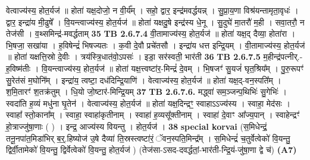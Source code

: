 \documentclass[17pt]{extarticle}
\begin{document}
                  वेत्वाज्य॑स्य॒ होत॒र्यज॑ ॥ होता॑ यक्ष॒दोजो॒ न वी॒र्य᳚म् । सहो॒ द्वार॒ इन्द्र॑मवर्द्धयन्न् । सु॒प्रा॒य॒णा विश्र॑यन्तामृता॒वृधः॑ । द्वार॒ इन्द्रा॑य मी॒ढुषे᳚ । वि॒यन्त्वाज्य॑स्य॒ होत॒र्यज॑ ॥ होता॑ यक्षदु॒षे इन्द्र॑स्य धे॒नू । सु॒दुघे॑ मा॒तरौ॑ म॒ही । सवा॒तरौ॒ न तेज॑सी । व॒थ्समिन्द्र॑-मवर्द्धताम् \textbf{ 35} \newline
                  \newline
                                \textbf{ TB 2.6.7.4} \newline
                  वी॒तामाज्य॑स्य॒ होत॒र्यज॑ ॥ होता॑ यक्ष॒द् दैव्या॒ होता॑रा । भि॒षजा॒ सखा॑या । ह॒विषेन्द्रं॑ भिषज्यतः । क॒वी दे॒वौ प्रचे॑तसौ । इन्द्रा॑य धत्त इन्द्रि॒यम् । वी॒तामाज्य॑स्य॒ होत॒र्यज॑ ॥ होता॑ यक्षत्ति॒स्रो दे॒वीः । त्रय॑स्त्रि॒धात॑वो॒ऽपसः॑ । इडा॒ सर॑स्वती॒ भार॑ती \textbf{ 36} \newline
                  \newline
                                \textbf{ TB 2.6.7.5} \newline
                  म॒हीन्द्र॑पत्नीर्.-ह॒विष्म॑तीः । वि॒यन्त्वाज्य॑स्य॒ होत॒र्यज॑ ॥ होता॑ यक्ष॒त्त्वष्टा॑र॒-मिन्द्रं॑ दे॒वम् । भि॒षजꣳ॑ सु॒यजं॑ घृत॒श्रिय᳚म् । पु॒रु॒रूपꣳ॑ सु॒रेत॑सं म॒घोनि᳚म् । इन्द्रा॑य॒ त्वष्टा॒ दध॑दिन्द्रि॒याणि॑ । वेत्वाज्य॑स्य॒ होत॒र्यज॑ ॥ होता॑ यक्ष॒द्-वन॒स्पति᳚म् । श॒मि॒तारꣳ॑ श॒तक्र॑तुम् । धि॒यो जो॒ष्टार॑-मिन्द्रि॒यम् \textbf{ 37} \newline
                  \newline
                                \textbf{ TB 2.6.7.6.} \newline
                  मद्ध्वा॑ सम॒ञ्जन्प॒थिभिः॑ सु॒गेभिः॑ । स्वदा॑ति ह॒व्यं मधु॑ना घृ॒तेन॑ । वेत्वाज्य॑स्य॒ होत॒र्यज॑ ॥ होता॑ यक्ष॒दिन्द्रꣳ॒॒ स्वाहाऽऽज्य॑स्य । स्वाहा॒ मेद॑सः । स्वाहा᳚ स्तो॒काना᳚म् । स्वाहा॒ स्वाहा॑कृतीनाम् । स्वाहा॑ ह॒व्यसू᳚क्तीनाम् । स्वाहा॑ दे॒वाꣳ आ᳚ज्य॒पान् । स्वाहेन्द्रꣳ॑ हो॒त्राज्जु॑षा॒णाः ( ) । इन्द्र॒ आज्य॑स्य वियन्तु । होत॒र्यज॑ । \textbf{ 38} \newline
                  \newline
                                                        \textbf{special korvai} \newline
              (स॒मिधेन्द्रं॒ तनू॒नपा॑त॒मिडा॑भिर् ब॒र्॒.हिष्योज॑ उ॒षे दैव्या॑ ति॒स्रस्त्वष्टा॑रं॒ ॅवन॒स्पति॒मिन्द्र᳚म् । स॒मिधेन्द्रं॑ च॒तुर्वेत्वेको॑ वि॒यन्तु॒ द्विर्वी॒तामेको॑ वि॒यन्तु॒ द्विर्वेत्वेको॑ वि॒यन्तु॒ होत॒र्यज॑ ) \newline
                                (तेज॑सा-ऽसद-दवर्द्धतां॒-भार॑ती-न्द्रि॒यं-जु॑षा॒णा द्वे च॑) \textbf{(A7)} \newline \newline
\end{document}
